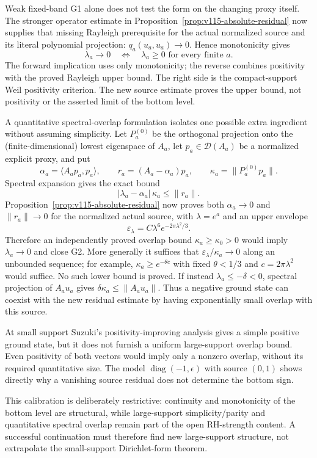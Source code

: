 \documentclass[11pt]{article}
\theoremstyle{remark}
\begin{document}
Weak fixed-band G1 alone does not test the form on the changing
proxy itself. The stronger operator estimate in
Proposition~\ref{prop:v115-absolute-residual} now supplies that missing
Rayleigh prerequisite for the actual normalized source and its literal
polynomial projection: $q_a(u_a,u_a)\to0$. Hence monotonicity gives
\[
 \lambda_a\to0\quad\Longleftrightarrow\quad
 \lambda_a\ge0\text{ for every finite }a.
\]
The forward implication uses only monotonicity; the reverse combines
positivity with the proved Rayleigh upper bound. The right side is the
compact-support Weil positivity criterion. The new source estimate
proves the upper bound, not positivity or the asserted limit of the
bottom level.

A quantitative spectral-overlap formulation isolates one possible extra ingredient without assuming simplicity.  Let $P_a^{(0)}$ be the orthogonal projection onto the (finite-dimensional) lowest eigenspace of $A_a$, let $p_a\in\mathcal D(A_a)$ be a normalized explicit proxy, and put
\[
 \alpha_a=\langle A_ap_a,p_a\rangle,
 \qquad
 r_a=(A_a-\alpha_a)p_a,
 \qquad
 \kappa_a=\|P_a^{(0)}p_a\|.
\]
Spectral expansion gives the exact bound
\[
 \boxed{
 |\lambda_a-\alpha_a|\,\kappa_a\le \|r_a\|.
 }
 \tag{G2.3}
\]
Proposition~\ref{prop:v115-absolute-residual} now proves both
$\alpha_a\to0$ and $\|r_a\|\to0$ for the normalized actual source,
with $\lambda=e^a$ and an upper envelope
\[
 \varepsilon_\lambda=C\lambda^6e^{-2\pi\lambda^2/3}.
\]
Therefore an independently proved overlap bound
$\kappa_a\ge\kappa_0>0$ would imply $\lambda_a\to0$ and close G2.
More generally it suffices that
$\varepsilon_\lambda/\kappa_a\to0$ along an unbounded sequence;
for example, $\kappa_a\ge e^{-\theta c}$ with fixed
$\theta<1/3$ and $c=2\pi\lambda^2$ would suffice.
No such lower bound is proved. If instead
$\lambda_a\le-\delta<0$, spectral projection of
$A_au_a$ gives $\delta\kappa_a\le\|A_au_a\|$.
Thus a negative ground state can coexist with the new residual estimate
by having exponentially small overlap with this source.

At small support Suzuki's positivity-improving analysis gives a simple
positive ground state, but it does not furnish a uniform large-support
overlap bound. Even positivity of both vectors would imply only a
nonzero overlap, without its required quantitative size. The model
$\operatorname{diag}(-1,\epsilon)$ with source $(0,1)$ shows directly
why a vanishing source residual does not determine the bottom sign.

This calibration is deliberately restrictive: continuity and monotonicity of the bottom level are structural, while large-support simplicity/parity and quantitative spectral overlap remain part of the open RH-strength content.  A successful continuation must therefore find new large-support structure, not extrapolate the small-support Dirichlet-form theorem.
\end{document}
